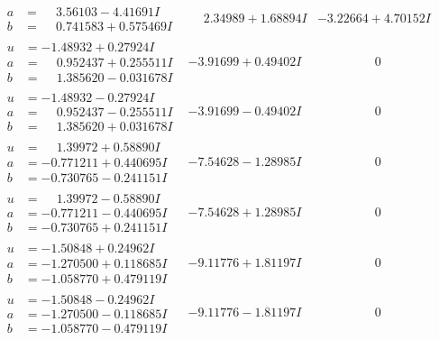 \documentclass[1p]{elsarticle_modified}
\theoremstyle{definition}
\begin{document}
$$\begin{array}{c|c|c}
\begin{aligned}
a &= \phantom{-}3.56103 - 4.41691 I \\
b &= \phantom{-}0.741583 + 0.575469 I\end{aligned}
 & \phantom{-}2.34989 + 1.68894 I & -3.22664 + 4.70152 I \\ \hline\begin{aligned}
u &= -1.48932 + 0.27924 I \\
a &= \phantom{-}0.952437 + 0.255511 I \\
b &= \phantom{-}1.385620 - 0.031678 I\end{aligned}
 & -3.91699 + 0.49402 I & \phantom{-0.000000 } 0 \\ \hline\begin{aligned}
u &= -1.48932 - 0.27924 I \\
a &= \phantom{-}0.952437 - 0.255511 I \\
b &= \phantom{-}1.385620 + 0.031678 I\end{aligned}
 & -3.91699 - 0.49402 I & \phantom{-0.000000 } 0 \\ \hline\begin{aligned}
u &= \phantom{-}1.39972 + 0.58890 I \\
a &= -0.771211 + 0.440695 I \\
b &= -0.730765 - 0.241151 I\end{aligned}
 & -7.54628 - 1.28985 I & \phantom{-0.000000 } 0 \\ \hline\begin{aligned}
u &= \phantom{-}1.39972 - 0.58890 I \\
a &= -0.771211 - 0.440695 I \\
b &= -0.730765 + 0.241151 I\end{aligned}
 & -7.54628 + 1.28985 I & \phantom{-0.000000 } 0 \\ \hline\begin{aligned}
u &= -1.50848 + 0.24962 I \\
a &= -1.270500 + 0.118685 I \\
b &= -1.058770 + 0.479119 I\end{aligned}
 & -9.11776 + 1.81197 I & \phantom{-0.000000 } 0 \\ \hline\begin{aligned}
u &= -1.50848 - 0.24962 I \\
a &= -1.270500 - 0.118685 I \\
b &= -1.058770 - 0.479119 I\end{aligned}
 & -9.11776 - 1.81197 I & \phantom{-0.000000 } 0 \\ \hline\begin{aligned}

\end{aligned}
\end{array}$$
\end{document}
